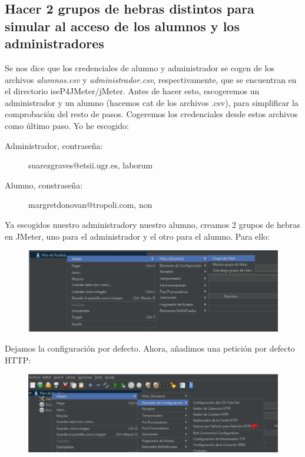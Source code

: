 \documentclass[a4paper]{article}
\begin{document}
\subsection{Hacer 2 grupos de hebras distintos para simular al acceso de los alumnos
y los administradores}
Se nos dice que los credenciales de alumno y administrador se cogen de los archivos
\textsl{alumnos.csv} y \textsl{administrador.csv}, respectivamente, que se encuentran en
el directorio iseP4JMeter/jMeter. Antes de hacer esto, escogeremos un 
administrador y un alumno (hacemos cat de los archivos .csv), para simplificar
la comprobación del resto de pasos. Cogeremos los credenciales desde estos
archivos como último paso. Yo he escogido:
\begin{description}
    \item[Administrador, contraseña:] suarezgraves@etsii.ugr.es, laborum
    \item[Alumno, constraseña:] margretdonovan@tropoli.com, non  
\end{description}
Ya escogidos nuestro administradory nuestro alumno, creamos 2 grupos de hebras 
en JMeter, uno para el administrador y el otro para el alumno. Para ello:
\begin{figure}[hbt!]
    \centering
    \includegraphics[width=\textwidth]{crear grupo hilos.png}
\end{figure}
Dejamos la configuración por defecto. \newline
Ahora, añadimos una petición por defecto HTTP:
\newpage
\begin{figure}[hbt!]
    \includegraphics[width=\textwidth]{valores por defecto peticion.png}
\end{figure}
\end{document}

